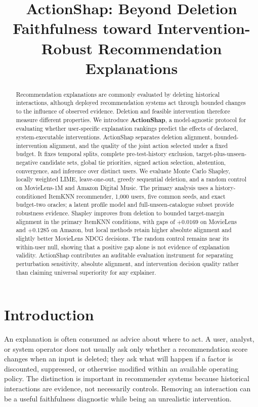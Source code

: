 \documentclass[pdflatex,sn-basic,Numbered]{sn-jnl}
\title[ActionShap]{ActionShap: Beyond Deletion Faithfulness toward Intervention-Robust Recommendation Explanations}
\author*[1]{\fnm{Mouad} \sur{Louhichi}}\email{mouad.louhichi@um5.ac.ma}
\author[1]{\fnm{Redwane} \sur{Nesmaoui}}
\author[1]{\fnm{Mohamed} \sur{Lazaar}}
\affil[1]{\orgdiv{National Higher School of Computer Science and Systems Analysis (ENSIAS)}, \orgname{Mohammed V University in Rabat}, \orgaddress{\city{Rabat}, \country{Morocco}}}
\begin{document}
\maketitle

\begin{abstract}
Recommendation explanations are commonly evaluated by deleting historical interactions, although deployed recommendation systems act through bounded changes to the influence of observed evidence. Deletion and feasible intervention therefore measure different properties. We introduce \textbf{ActionShap}, a model-agnostic protocol for evaluating whether user-specific explanation rankings predict the effects of declared, system-executable interventions. ActionShap separates deletion alignment, bounded-intervention alignment, and the quality of the joint action selected under a fixed budget. It fixes temporal splits, complete pre-test-history exclusion, target-plus-unseen-negative candidate sets, global tie priorities, signed action selection, abstention, convergence, and inference over distinct users. We evaluate Monte Carlo Shapley, locally weighted LIME, leave-one-out, greedy sequential deletion, and a random control on MovieLens-1M and Amazon Digital Music. The primary analysis uses a history-conditioned ItemKNN recommender, 1,000 users, five common seeds, and exact budget-two oracles; a latent profile model and full-unseen-catalogue subset provide robustness evidence. Shapley improves from deletion to bounded target-margin alignment in the primary ItemKNN conditions, with gaps of $+0.0169$ on MovieLens and $+0.1285$ on Amazon, but local methods retain higher absolute alignment and slightly better MovieLens NDCG decisions. The random control remains near its within-user null, showing that a positive gap alone is not evidence of explanation validity. ActionShap contributes an auditable evaluation instrument for separating perturbation sensitivity, absolute alignment, and intervention decision quality rather than claiming universal superiority for any explainer.
\end{abstract}


\section{Introduction}
An explanation is often consumed as advice about where to act. A user, analyst, or system operator does not usually ask only whether a recommendation score changes when an input is deleted; they ask what will happen if a factor is discounted, suppressed, or otherwise modified within an available operating policy. The distinction is important in recommender systems because historical interactions are evidence, not necessarily controls. Removing an interaction can be a useful faithfulness diagnostic while being an unrealistic intervention.
\end{document}
